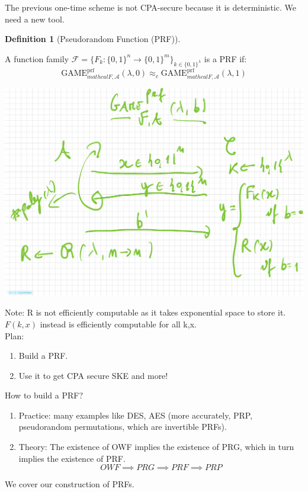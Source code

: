 \documentclass[11pt, a4paper]{article}
\newcommand{\game}{\text{GAME}}
\newtheorem{defn}{Definition}
\begin{document}
The previous one-time scheme is not CPA-secure because it is deterministic. We need a new tool.
\begin{defn}[Pseudorandom Function (PRF)]
    
\end{defn}
A function family $\mathcal{F} = \{F_k : \{0,1\}^n \to \{0,1\}^m\}_{k \in \{0,1\}^\lambda}$ is a PRF if:
$$\game_{mathcal{F},\mathcal{A}}^{\text{prf}}(\lambda,0) \approx_c \game_{mathcal{F},\mathcal{A}}^{\text{prf}}(\lambda,1)$$
\begin{center}
    \includegraphics[scale=0.4]{img/Comp_sec/prf.png}
\end{center}
Note: R is not efficiently computable as it takes exponential space to store it. $F(k,x)$ instead is efficiently computable for all k,x.\\
Plan:
\begin{enumerate}
    \item Build a PRF.
    \item Use it to get CPA secure SKE and more!
\end{enumerate}
How to build a PRF?
\begin{enumerate}
    \item Practice: many examples like DES, AES (more accurately, PRP, pseudorandom permutations, which are invertible PRFs).
    \item Theory: The existence of OWF implies the existence of PRG, which in turn implies the existence of PRF.
    $$OWF \implies PRG \implies PRF \implies PRP$$
\end{enumerate}
We cover our construction of PRFs.
\end{document}

